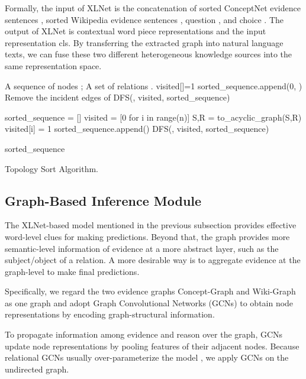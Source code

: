 \documentclass[letterpaper]{article} \usepackage{aaai20}  \usepackage{times}  \usepackage{helvet} \usepackage{courier}  \usepackage[hyphens]{url}  \usepackage{graphicx} \urlstyle{rm} \def\UrlFont{\rm}  \usepackage{graphicx}  \frenchspacing  \setlength{\pdfpagewidth}{8.5in}  \setlength{\pdfpageheight}{11in}
\begin{document}
Formally, the input of XLNet is the concatenation of sorted ConceptNet evidence sentences , sorted Wikipedia evidence sentences ,  question , and choice . The output of XLNet is contextual word piece representations and the input representation cls. By transferring the extracted graph into natural language texts, we can fuse these two different heterogeneous knowledge sources into the same representation space.

\begin{algorithm}[t]
\centering
\footnotesize
\begin{algorithmic}[1]
\Require
A sequence of nodes ; A set of relations  . 
\State
visited[]=1
\State
sorted\_sequence.append(0, )
\State Remove the incident edges of 
\State DFS(, visited, sorted\_sequence)
\EndIf
\EndFor

\EndFunction
\State
sorted\_sequence = []
\State
visited = [0 for i in range(n)]
\State
S,R = to\_acyclic\_graph(S,R)
\State
visited[i] = 1
\State sorted\_sequence.append()
\State
DFS(, visited, sorted\_sequence)


\EndIf
\EndFor
\State
\Return sorted\_sequence
\end{algorithmic}
\caption{Topology Sort Algorithm.}
\label{alg:training}
\end{algorithm}


\subsection{Graph-Based Inference Module}
The XLNet-based model mentioned in the previous subsection provides effective word-level clues for making predictions.
Beyond that, the graph provides more semantic-level information of evidence at a more abstract layer, such as the subject/object of a relation.
A more desirable way is to aggregate evidence at the 
graph-level to make final predictions.

Specifically, we regard the two evidence graphs Concept-Graph and Wiki-Graph as one graph and adopt Graph Convolutional Networks (GCNs) \cite{kipf2016semi} to obtain node representations by encoding graph-structural information.

To propagate information among evidence and reason over the graph, GCNs update node representations by pooling features of their adjacent nodes. Because relational GCNs usually over-parameterize the model \cite{marcheggiani2017encoding,zhang2018graph}, we apply GCNs on the undirected graph.
\end{document}
